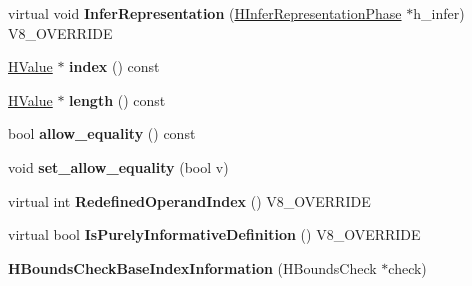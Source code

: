 \begin{DoxyCompactItemize}
\item 
\hypertarget{classv8_1_1internal_1_1_v8___f_i_n_a_l_af3bdd2a407d823e317547d7f761a77c7}{}virtual void {\bfseries Infer\+Representation} (\hyperlink{classv8_1_1internal_1_1_h_infer_representation_phase}{H\+Infer\+Representation\+Phase} $\ast$h\+\_\+infer) V8\+\_\+\+O\+V\+E\+R\+R\+I\+D\+E\label{classv8_1_1internal_1_1_v8___f_i_n_a_l_af3bdd2a407d823e317547d7f761a77c7}

\item 
\hypertarget{classv8_1_1internal_1_1_v8___f_i_n_a_l_ae35cd4b0e5fed0e15fcbbaaad81399c5}{}\hyperlink{classv8_1_1internal_1_1_h_value}{H\+Value} $\ast$ {\bfseries index} () const \label{classv8_1_1internal_1_1_v8___f_i_n_a_l_ae35cd4b0e5fed0e15fcbbaaad81399c5}

\item 
\hypertarget{classv8_1_1internal_1_1_v8___f_i_n_a_l_ab7b83a87df9a2ccda4486746a0b3dd05}{}\hyperlink{classv8_1_1internal_1_1_h_value}{H\+Value} $\ast$ {\bfseries length} () const \label{classv8_1_1internal_1_1_v8___f_i_n_a_l_ab7b83a87df9a2ccda4486746a0b3dd05}

\item 
\hypertarget{classv8_1_1internal_1_1_v8___f_i_n_a_l_ae13118dff514bf7c44654fabac4b6df2}{}bool {\bfseries allow\+\_\+equality} () const \label{classv8_1_1internal_1_1_v8___f_i_n_a_l_ae13118dff514bf7c44654fabac4b6df2}

\item 
\hypertarget{classv8_1_1internal_1_1_v8___f_i_n_a_l_a1d2947c62b8d7494078a97b3db683612}{}void {\bfseries set\+\_\+allow\+\_\+equality} (bool v)\label{classv8_1_1internal_1_1_v8___f_i_n_a_l_a1d2947c62b8d7494078a97b3db683612}

\item 
\hypertarget{classv8_1_1internal_1_1_v8___f_i_n_a_l_aa38d0bfa11ff102b029e933d42ff6107}{}virtual int {\bfseries Redefined\+Operand\+Index} () V8\+\_\+\+O\+V\+E\+R\+R\+I\+D\+E\label{classv8_1_1internal_1_1_v8___f_i_n_a_l_aa38d0bfa11ff102b029e933d42ff6107}

\item 
\hypertarget{classv8_1_1internal_1_1_v8___f_i_n_a_l_a7126cc998f93ad5f84e3a04eef6d7b9e}{}virtual bool {\bfseries Is\+Purely\+Informative\+Definition} () V8\+\_\+\+O\+V\+E\+R\+R\+I\+D\+E\label{classv8_1_1internal_1_1_v8___f_i_n_a_l_a7126cc998f93ad5f84e3a04eef6d7b9e}

\item 
\hypertarget{classv8_1_1internal_1_1_v8___f_i_n_a_l_a209afcadc1bb3117b1ce30882c72c9de}{}{\bfseries H\+Bounds\+Check\+Base\+Index\+Information} (H\+Bounds\+Check $\ast$check)\label{classv8_1_1internal_1_1_v8___f_i_n_a_l_a209afcadc1bb3117b1ce30882c72c9de}


\end{DoxyCompactItemize}
